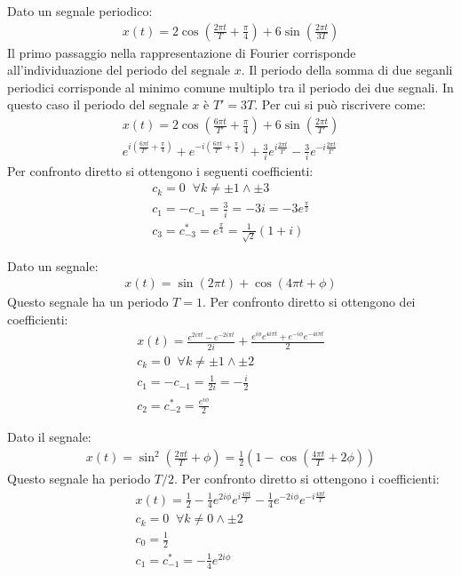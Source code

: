 \documentclass{article}
\numberwithin{equation}{subsection}
\begin{document}
Dato un segnale periodico:
\begin{gather*}
    x(t)=2\cos\displaystyle\left(\frac{2\pi t}{T}+\frac{\pi}{4}\right)+6\sin\left(\frac{2\pi t}{3T}\right)
\end{gather*}
Il primo passaggio nella rappresentazione di Fourier corrisponde all'individuazione del periodo del segnale $x$. Il periodo della somma di due seganli periodici corrisponde 
al minimo comune multiplo tra il periodo dei due segnali. In questo caso il periodo del segnale $x$ è $T'=3T$. Per cui si può riscrivere come:
\begin{gather*}
    x(t)=\displaystyle2\cos\left(\frac{6\pi t}{T'}+\frac{\pi}{4}\right)+6\sin\left(\frac{2\pi t}{T'}\right)\\
    \displaystyle e^{i\left(\frac{6\pi t}{T'}+\frac{\pi}{4}\right)}+e^{-i\left(\frac{6\pi t}{T'}+\frac{\pi}{4}\right)}+\frac{3}{i}e^{i\frac{2\pi t}{T'}}-\frac{3}{i}e^{-i\frac{2\pi t}{T'}}
\end{gather*} 
Per confronto diretto si ottengono i seguenti coefficienti:
\begin{gather*}
    c_k=0\;\; \forall k\neq\pm1\land\pm3\\
    c_1=-c_{-1}=\displaystyle\frac{3}{i}=-3i=-3e^{\frac{\pi}{2}}\\
    c_{3}=c_{-3}^*=\displaystyle e^{\frac{\pi}{4}}=\frac{1}{\sqrt{2}}(1+i)
\end{gather*}


Dato un segnale:
\begin{gather*}
    x(t)=\sin\displaystyle(2\pi t)+\cos(4\pi t+\phi)
\end{gather*}
Questo segnale ha un periodo $T=1$. Per confronto diretto si ottengono dei coefficienti:
\begin{gather*}
    x(t)=\displaystyle \frac{e^{2i\pi t}-e^{-2i\pi t}}{2i}+\frac{e^{i\phi}e^{4i\pi t}+e^{-i\phi}e^{-4i\pi t}}{2}\\
    c_k=0\;\;\forall k\neq\pm1\land\pm2\\
    c_1=-c_{-1}=\displaystyle\frac{1}{2i}=-\frac{i}{2}\\
    c_2=c_{-2}^*=\displaystyle\frac{e^{i\phi}}{2}
\end{gather*}

Dato il segnale:
\begin{gather*}
    x(t)=\sin^2\displaystyle\left(\frac{2\pi t}{T}+\phi\right)=\frac{1}{2}\left(1-\cos\left(\frac{4\pi t}{T}+2\phi\right)\right)
\end{gather*}
Questo segnale ha periodo $T/2$. Per confronto diretto si ottengono i coefficienti:
\begin{gather*}
    x(t)=\displaystyle\frac{1}{2}-\frac{1}{4}e^{2i\phi}e^{i\frac{4\pi t}{T}}-\frac{1}{4}e^{-2i\phi}e^{-i\frac{4\pi t}{T}}\\
    c_k=0\;\;\forall k\neq0\land\pm2\\
    c_0=\displaystyle\frac{1}{2}\\
    c_1=c_{-1}^*=-\displaystyle\frac{1}{4}e^{2i\phi}
\end{gather*}
\end{document}
